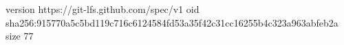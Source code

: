 version https://git-lfs.github.com/spec/v1
oid sha256:915770a5c5bd119c716c6124584fd53a35f42c31cc16255b4c323a963abfeb2a
size 77
